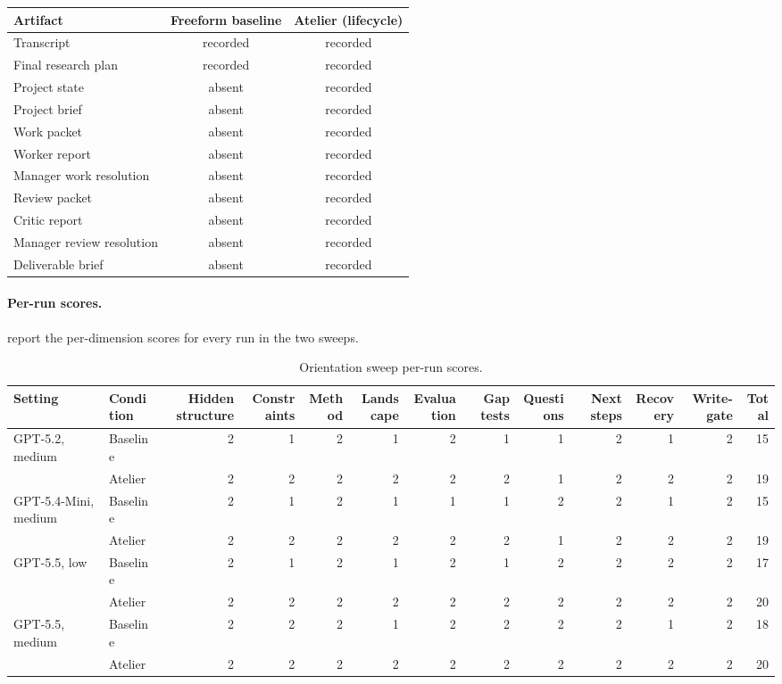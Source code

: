 \begin{center}
  \scriptsize
  \setlength{\tabcolsep}{4pt}
  \begin{tabular}{@{}p{}cc@{}}
    \toprule
    Artifact & Freeform baseline & Atelier (lifecycle) \\
    \midrule
    Transcript & recorded & recorded \\
    Final research plan & recorded & recorded \\
    Project state & absent & recorded \\
    Project brief & absent & recorded \\
    Work packet & absent & recorded \\
    Worker report & absent & recorded \\
    Manager work resolution & absent & recorded \\
    Review packet & absent & recorded \\
    Critic report & absent & recorded \\
    Manager review resolution & absent & recorded \\
    Deliverable brief & absent & recorded \\
    \bottomrule
  \end{tabular}
\end{center}

\paragraph{Per-run scores.}
 report the per-dimension scores for every run in the two sweeps.

\begin{table}[t]
  \centering
  \scriptsize
  \setlength{\tabcolsep}{4pt}
  \begin{tabular}{@{}llrrrrrrrrrrr@{}}
    \toprule
    Setting & Condition & Hidden structure & Constraints & Method & Landscape & Evaluation & Gap tests & Questions & Next steps & Recovery & Write-gate & Total \\
    \midrule
    GPT-5.2, medium      & Baseline & 2 & 1 & 2 & 1 & 2 & 1 & 1 & 2 & 1 & 2 & 15 \\
                         & Atelier  & 2 & 2 & 2 & 2 & 2 & 2 & 1 & 2 & 2 & 2 & 19 \\
    GPT-5.4-Mini, medium & Baseline & 2 & 1 & 2 & 1 & 1 & 1 & 2 & 2 & 1 & 2 & 15 \\
                         & Atelier  & 2 & 2 & 2 & 2 & 2 & 2 & 1 & 2 & 2 & 2 & 19 \\
    GPT-5.5, low         & Baseline & 2 & 1 & 2 & 1 & 2 & 1 & 2 & 2 & 2 & 2 & 17 \\
                         & Atelier  & 2 & 2 & 2 & 2 & 2 & 2 & 2 & 2 & 2 & 2 & 20 \\
    GPT-5.5, medium      & Baseline & 2 & 2 & 2 & 1 & 2 & 2 & 2 & 2 & 1 & 2 & 18 \\
                         & Atelier  & 2 & 2 & 2 & 2 & 2 & 2 & 2 & 2 & 2 & 2 & 20 \\
    \bottomrule
  \end{tabular}
  \caption{Orientation sweep per-run scores.}
  \label{tab:orient-per-run}
\end{table}

